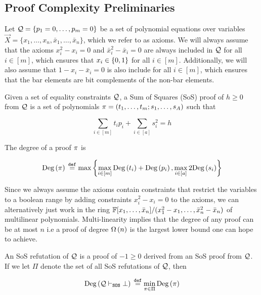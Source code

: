 \documentclass[11pt]{article}
\begin{document}
\subsection{Proof Complexity Preliminaries}
\label{sec:proof-system-prelims}

Let $\mathcal{Q} = \{ p_1 = 0, \dots, p_m = 0\}$ be a set of polynomial equations over variables $\vec{X} = \{x_1, \dots, x_n, \bar{x}_1, \dots, \bar{x}_n\}$, which we refer to as axioms.
We will always assume that the axioms $x_i^2 - x_i = 0$ and $\bar{x}_i^2 - \bar{x}_i = 0$ are always included in $\mathcal{Q}$ for all $i \in [m]$, which ensures that $x_i \in \{0,1\}$ for all $i\in [m]$.
Additionally, we will also assume that $1 - x_i - \bar{x}_i=0$ is also include for all $i \in [m]$, which ensures that the bar elements are bit complements of the non-bar elements.

\begin{definition}\label{def:sum-of-squares} Given a set of equality constraints $\mathcal{Q}$, a Sum of Squares (SoS) proof of $h \geq 0$ from $\mathcal{Q}$ is a set of polynomials $\pi = (t_1, \dots, t_m; s_1, \dots, s_A)$ such that 

\[ \sum_{i \in [m]} t_ip_i+ \sum_{i \in [a]} s_i^2 = h\]

The degree of a proof $\pi$ is 

\[ \text{Deg}\left(\pi\right) \text{}\overset{\mathtt{def}}{=} \max\left\{\max_{i \in [m]} \text{Deg}\left(t_i\right) + \text{Deg}\left(p_i\right), \max_{i \in [a]} 2\text{Deg}\left(s_i\right)\right\}\]	


\end{definition}

Since we always assume the axioms contain constraints that restrict the variables to a boolean range by adding constraints $x_i^2 - x_i=0$ to the axioms, we can alternatively just work in the ring $\mathbb{F}[x_1, \dots, \bar{x}_n]/(x_1^2 - x_1, \dots, \bar{x}_n^2 - \bar{x}_n)$ of multilinear polynomials.
Multi-linearity implies that the degree of any proof can be at most $n$ i.e a proof of degree $\Omega\left(n\right)$ is the largest lower bound one can hope to achieve.

\begin{definition}
An SoS refutation of $\mathcal{Q}$ is a proof of $-1 \geq 0$ derived from an SoS proof from $\mathcal{Q}$. If we let $\Pi$ denote the set of all SoS refutations of $\mathcal{Q}$, then  

\[ \text{Deg}\left(\mathcal{Q} \vdash_{\texttt{SOS}} \bot\right) \text{}\overset{\mathtt{def}}{=} \min_{\pi \in \Pi}\text{Deg}\left(\pi\right)\]
	
\end{definition}
\end{document}
